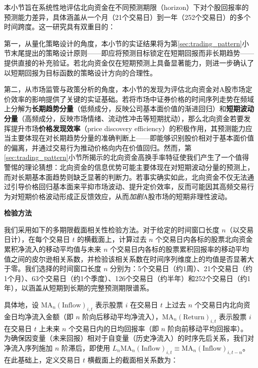 \documentclass{article}
\begin{document}
本小节旨在系统性地评估北向资金在不同预测期限（horizon）下对个股回报率的预测能力差异，具体涵盖从一个月（21个交易日）到一年（252个交易日）的多个时间跨度。这一研究具有双重目的：

第一，从量化策略设计的角度，本小节的实证结果将为第\ref{sec:trading_pattern}小节末尾提出的策略设计原则——即应将预测目标锁定在短期回报而非长期趋势——提供直接的补充验证。若北向资金仅在短期预测上具备显著能力，则进一步确认了以短期回报为目标函数的策略设计方向的合理性。

第二，从市场监管与政策分析的角度，本小节的发现为评估北向资金对A股市场定价效率的影响提供了关键的实证基础。若将市场中证券价格的时间序列走势在频域上分解为\textbf{长期趋势分量}（低频成分，反映公司基本面价值的渐进回归）和\textbf{短期波动分量}（高频成分，反映市场情绪、流动性冲击等短期扰动），那么北向资金若要发挥提升市场\textbf{价格发现效率}（price discovery efficiency）的积极作用，其预测能力应当主要体现在对长期趋势分量的准确判断上——即能够识别股价相对于基本面价值的偏离，并通过交易行为推动价格向内在价值回归。然而，第\ref{sec:trading_pattern}小节所揭示的北向资金高换手率特征使我们产生了一个值得警惕的理论猜想：北向资金的信息优势可能主要体现在对短期波动分量的预测上，而对长期基本面趋势则缺乏显著的判断力。若事实确实如此，北向资金不仅无法通过引导价格回归基本面来平抑市场波动、提升定价效率，反而可能因其高频交易行为对短期价格波动形成正反馈效应，从而\textit{加剧}A股市场的短期非理性波动。

\vspace{0.5em}
\noindent\textbf{检验方法}

我们采用如下的多期限截面相关性检验方法。对于给定的时间窗口长度 $n$（以交易日计），在每个交易日 $t$ 的横截面上，计算过去 $n$ 个交易日内各标的股票北向资金累积净流入的移动平均值与未来 $n$ 个交易日内各标的股票累积回报率的移动平均值之间的皮尔逊相关系数，并检验该相关系数在时间序列维度上的均值是否显著大于零。我们选择的时间窗口长度 $n$ 分别为：5个交易日（约1周）、21个交易日（约1个月）、63个交易日（约1个季度）、126个交易日（约半年）和252个交易日（约1年），以涵盖从短期到长期的完整预测期限谱系。

具体地，设 $\text{MA}_n(\text{Inflow})_{i,t}$ 表示股票 $i$ 在交易日 $t$ 上过去 $n$ 个交易日内北向资金日均净流入金额（即 $n$ 阶向后移动平均净流入），$\text{MA}_n(\text{Return})_{i,t}$ 表示股票 $i$ 在交易日 $t$ 上未来 $n$ 个交易日内的日均回报率（即 $n$ 阶向前移动平均回报率）。为确保因变量（未来回报）相对于自变量（历史净流入）的时序先后关系，我们对净流入序列施加 $n$ 阶滞后，即使用 $L_n\text{MA}_n(\text{Inflow})_{i,t} \equiv \text{MA}_n(\text{Inflow})_{i,t-n}$。在此基础上，定义交易日 $t$ 横截面上的截面相关系数为：
\end{document}
